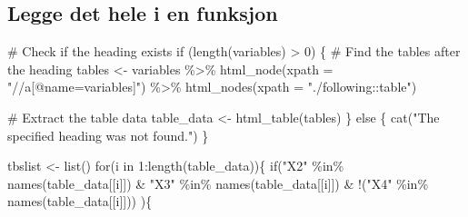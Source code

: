 \documentclass[
  letterpaper,
  DIV=11,
  numbers=noendperiod]{scrreprt}
\newenvironment{Shaded}{\begin{snugshade}}{\end{snugshade}}
\newcommand{\AttributeTok}[1]{\textcolor[rgb]{0.40,0.45,0.13}{#1}}
\newcommand{\CommentTok}[1]{\textcolor[rgb]{0.37,0.37,0.37}{#1}}
\newcommand{\ControlFlowTok}[1]{\textcolor[rgb]{0.00,0.23,0.31}{#1}}
\newcommand{\DecValTok}[1]{\textcolor[rgb]{0.68,0.00,0.00}{#1}}
\newcommand{\FunctionTok}[1]{\textcolor[rgb]{0.28,0.35,0.67}{#1}}
\newcommand{\NormalTok}[1]{\textcolor[rgb]{0.00,0.23,0.31}{#1}}
\newcommand{\OtherTok}[1]{\textcolor[rgb]{0.00,0.23,0.31}{#1}}
\newcommand{\SpecialCharTok}[1]{\textcolor[rgb]{0.37,0.37,0.37}{#1}}
\newcommand{\StringTok}[1]{\textcolor[rgb]{0.13,0.47,0.30}{#1}}
\theoremstyle{definition}
\theoremstyle{remark}
\begin{document}
\hypertarget{legge-det-hele-i-en-funksjon}{%
\subsection{Legge det hele i en
funksjon}\label{legge-det-hele-i-en-funksjon}}

\begin{Shaded}
\begin{Highlighting}[]
\CommentTok{\# Check if the heading exists}
\ControlFlowTok{if}\NormalTok{ (}\FunctionTok{length}\NormalTok{(variables) }\SpecialCharTok{\textgreater{}} \DecValTok{0}\NormalTok{) \{}
  \CommentTok{\# Find the tables after the heading}
\NormalTok{  tables }\OtherTok{\textless{}{-}}\NormalTok{ variables }\SpecialCharTok{\%\textgreater{}\%} 
    \FunctionTok{html\_node}\NormalTok{(}\AttributeTok{xpath =} \StringTok{"//a[@name=\textquotesingle{}variables\textquotesingle{}]"}\NormalTok{) }\SpecialCharTok{\%\textgreater{}\%} 
    \FunctionTok{html\_nodes}\NormalTok{(}\AttributeTok{xpath =} \StringTok{"./following::table"}\NormalTok{)}
  
  \CommentTok{\# Extract the table data}
\NormalTok{  table\_data }\OtherTok{\textless{}{-}} \FunctionTok{html\_table}\NormalTok{(tables)}
\NormalTok{  \} }\ControlFlowTok{else}\NormalTok{ \{}
  \FunctionTok{cat}\NormalTok{(}\StringTok{"The specified heading was not found."}\NormalTok{)}
\NormalTok{\}}


\NormalTok{tbslist }\OtherTok{\textless{}{-}} \FunctionTok{list}\NormalTok{()}
\ControlFlowTok{for}\NormalTok{(i }\ControlFlowTok{in} \DecValTok{1}\SpecialCharTok{:}\FunctionTok{length}\NormalTok{(table\_data))\{ }
  \ControlFlowTok{if}\NormalTok{(}\StringTok{"X2"} \SpecialCharTok{\%in\%} \FunctionTok{names}\NormalTok{(table\_data[[i]]) }\SpecialCharTok{\&} 
     \StringTok{"X3"} \SpecialCharTok{\%in\%} \FunctionTok{names}\NormalTok{(table\_data[[i]]) }\SpecialCharTok{\&} 
     \SpecialCharTok{!}\NormalTok{(}\StringTok{"X4"} \SpecialCharTok{\%in\%} \FunctionTok{names}\NormalTok{(table\_data[[i]])) )\{}
    

\end{Highlighting}
\end{Shaded}
\end{document}
